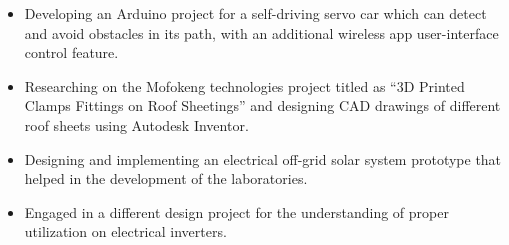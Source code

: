 \documentclass[10pt,a4paper,ragged2e]{altacv}
\begin{document}
\begin{itemize}

\item Developing an Arduino project for a self-driving servo car which can detect and avoid obstacles in its path, with an additional wireless app user-interface control feature.

\item Researching on the Mofokeng technologies project titled as ``3D Printed Clamps Fittings on Roof Sheetings'' and designing CAD drawings of different roof sheets using Autodesk Inventor.

\end{itemize}


\divider



\begin{itemize}
\item Designing and implementing an electrical off-grid solar system prototype that helped in the development of the laboratories.
\item Engaged in a different design project for the understanding of proper utilization on electrical inverters.
\end{itemize}


\end{document}
